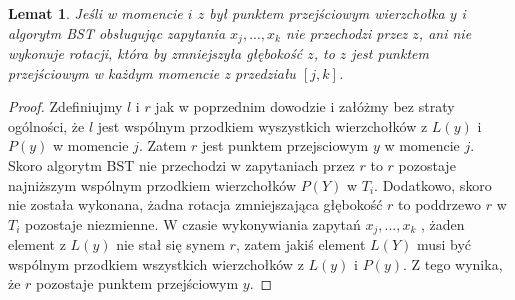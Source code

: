 \documentclass[declaration,shortabstract]{iithesis}
\theoremstyle{remark}
\theoremstyle{plain}
\theoremstyle{plain}
\theoremstyle{plain}
\newtheorem{lemma}[definition]{Lemat}
\begin{document}
\begin{lemma}
Jeśli w momencie $i$ $z$ był punktem przejściowym wierzchołka $y$ i algorytm BST obsługując zapytania $x_j, ..., x_k$  nie przechodzi przez $z$, ani nie wykonuje rotacji, która by zmniejszyła głębokość $z$, to $z$ jest punktem przejściowym w każdym momencie z przedziału \([j, k]\). 
\end{lemma}
\begin{proof}
Zdefiniujmy $l$ i $r$ jak w poprzednim dowodzie i załóżmy bez straty ogólności, że $l$ jest wspólnym przodkiem wyszystkich wierzchołków z $L(y)$ i $P(y)$ w momencie $j$. Zatem $r$ jest punktem przejsciowym $y$ w momencie $j$. Skoro algorytm BST nie przechodzi w zapytaniach przez $r$ to $r$ pozostaje najniższym wspólnym przodkiem wierzchołków $P(Y)$ w $T_i$. Dodatkowo, skoro nie została wykonana, żadna rotacja zmniejszająca  głębokość $r$ to poddrzewo $r$ w \(T_i\) pozostaje niezmienne. W czasie wykonywiania zapytań \( x_j,..., x_k\) , żaden element z $L(y)$ nie stał się synem $r$, zatem jakiś element $L(Y)$ musi być wspólnym przodkiem wszystkich wierzchołków z $L(y)$ i $P(y)$.
Z tego wynika, że $r$ pozostaje punktem przejściowym $y$.
\end{proof}
\end{document}
